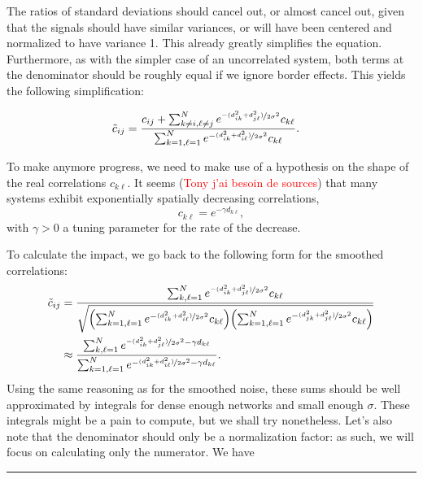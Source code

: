 \documentclass{article}
\begin{document}
\begin{multicols}{2}
    The ratios of standard deviations should cancel out, or almost cancel out, given that the signals should have similar variances, or will have been centered and normalized to have variance 1. This already greatly simplifies the equation. Furthermore, as with the simpler case of an uncorrelated system, both terms at the denominator should be roughly equal if we ignore border effects. This yields the following simplification:

\begin{align*}
    \Tilde{c}_{ij} &= \frac{c_{ij}+\sum_{k\neq i, \ell \neq j}^N e^{\nicefrac{-(d_{ik}^2+d_{j\ell}^2)}{2\sigma^2}}c_{k\ell}}{\sum_{k=1, \ell=1}^N e^{-\nicefrac{(d_{ik}^2+ d_{i\ell}^2)}{2\sigma^2}}c_{k\ell}}.
\end{align*}

To make anymore progress, we need to make use of a hypothesis on the shape of the real correlations $c_{k\ell}$. It seems (\textcolor{red}{Tony j'ai besoin de sources}) that many systems exhibit exponentially spatially decreasing correlations,
\begin{equation*}
    c_{k\ell} = e^{-\gamma d_{k\ell}},
\end{equation*}
with $\gamma>0$ a tuning parameter for the rate of the decrease.

To calculate the impact, we go back to the following form for the smoothed correlations:
\begin{align*}
    \Tilde{c}_{ij} &= \frac{\sum_{k, \ell =1}^N e^{\nicefrac{-(d_{ik}^2+d_{j\ell}^2)}{2\sigma^2}}c_{k\ell}}{\sqrt{\qty(\sum_{k=1, \ell=1}^N e^{-\nicefrac{(d_{ik}^2+ d_{i\ell}^2)}{2\sigma^2}}c_{k\ell})\qty(\sum_{k=1, \ell=1}^N e^{-\nicefrac{(d_{jk}^2+ d_{j\ell}^2)}{2\sigma^2}}c_{k\ell})}}\\
    &\approx \frac{\sum_{k, \ell =1}^N e^{\nicefrac{-(d_{ik}^2+d_{j\ell}^2)}{2\sigma^2}-\gamma d_{k\ell}}}{\sum_{k=1, \ell=1}^N e^{-\nicefrac{(d_{ik}^2+ d_{i\ell}^2)}{2\sigma^2}-\gamma d_{k\ell}}}.
\end{align*}
Using the same reasoning as for the smoothed noise, these sums should be well approximated by integrals for dense enough networks and small enough $\sigma$. These integrals might be a pain to compute, but we shall try nonetheless. Let's also note that the denominator should only be a normalization factor: as such, we will focus on calculating only the numerator. We have
\end{multicols}
\centering
\rule{0.66\textwidth}{0.4pt}
\end{document}
